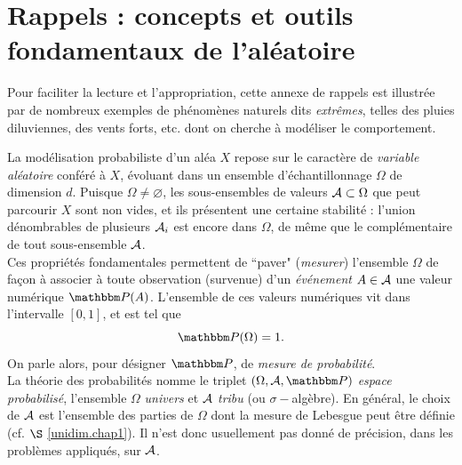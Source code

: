 \section{Rappels : concepts et outils fondamentaux de l'aléatoire}\label{concepts}

\begin{remark}
Pour faciliter la lecture et l'appropriation, cette annexe de rappels est illustrée par de nombreux exemples de phénomènes naturels dits \emph{extrêmes}, telles des pluies diluviennes, des vents forts, etc. dont on cherche à modéliser le comportement. 
\end{remark}


La mod\'elisation probabiliste d'un al\'ea $X$ repose sur le caract\`ere de {\it variable al\'eatoire} conf\'er\'e \`a $X$, \'evoluant dans un ensemble d'\'echantillonnage $\Omega$ de dimension $d$. Puisque $\Omega\neq\varnothing$, les sous-ensembles de valeurs ${\cal{A}}\subset\Omega$ que peut parcourir $X$ sont non vides, et ils pr\'esentent une certaine stabilit\'e : l'union d\'enombrables de plusieurs ${\cal{A}}_i$ est encore dans $\Omega$, de m\^eme que le compl\'ementaire de tout sous-ensemble ${\cal{A}}$. \\

 Ces propri\'et\'es fondamentales permettent de ``paver" ({\it mesurer}) l'ensemble $\Omega$ de fa\c con \`a associer \`a toute observation (survenue) d'un {\it \'ev\'enement} $A\in{\cal{A}}$ %
  une valeur num\'erique $\Pm(A)$. L'ensemble de ces valeurs num\'eriques vit dans l'intervalle $[0,1]$, et est tel que 
$$
\Pm(\Omega) = 1.
$$ 
On parle alors, pour d\'esigner $\Pm$, de {\it mesure de probabilit\'e}. \\ 

La th\'eorie des probabilit\'es nomme  le triplet $(\Omega,{\cal{A}},\Pm)$  {\it espace probabilis\'e}, l'ensemble $\Omega$ {\it univers} et ${\cal{A}}$  {\it tribu} (ou $\sigma-$alg\`ebre). En g\'en\'eral, le choix de ${\cal{A}}$ est l'ensemble des parties de $\Omega$ dont la mesure de Lebesgue peut \^etre d\'efinie (cf. $\S$ \ref{unidim.chap1}). %
Il n'est donc usuellement pas donn\'e de pr\'ecision, dans les probl\`emes appliqu\'es, sur ${\cal{A}}$. \\



